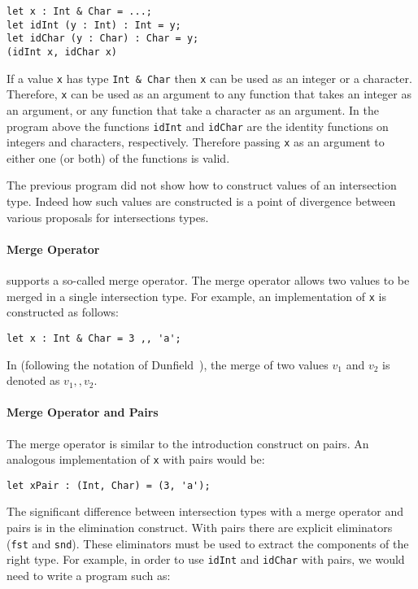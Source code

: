 \begin{lstlisting}
let x : Int & Char = ...;
let idInt (y : Int) : Int = y;
let idChar (y : Char) : Char = y;
(idInt x, idChar x)
\end{lstlisting} 

\noindent If a value \lstinline{x} has type \lstinline{Int & Char} then
\lstinline{x} can be used as an integer or a character. Therefore, 
\lstinline{x} can be used as an argument to any function that takes 
an integer as an argument, or any 
function that take a character as an argument. In the program above 
the functions \lstinline{idInt} and \lstinline{idChar} are the
identity functions on integers and characters, respectively. Therefore 
passing \lstinline{x} as an argument to either one (or both) of the
functions is valid. 

The previous program did not show how to construct values of an 
intersection type. Indeed how such values are constructed is a point 
of divergence between various proposals for intersections types.

\paragraph{Merge Operator}
\name supports a so-called merge operator. The merge operator allows 
two values to be merged in a single intersection type. For example, an 
implementation of \lstinline{x} is constructed as follows:

\begin{lstlisting}
let x : Int & Char = 3 ,, 'a';
\end{lstlisting}

\noindent In \name (following the notation of Dunfield~\cite{}), the
merge of two values $v_1$ and $v_2$ is denoted as $v_1 ,, v_2$.

\paragraph{Merge Operator and Pairs}
The merge operator is similar to the introduction construct on pairs. 
An analogous implementation of \lstinline{x} with pairs would be:

\begin{lstlisting}
let xPair : (Int, Char) = (3, 'a');
\end{lstlisting} 

\noindent The significant difference between intersection types with a
merge operator and pairs is in the elimination construct. With pairs
there are explicit eliminators (\lstinline{fst} and
\lstinline{snd}). These eliminators must be used to extract the
components of the right type. For example, in order to use
\lstinline{idInt} and \lstinline{idChar} with pairs, we would need to 
write a program such as: 


